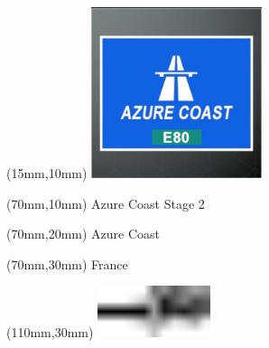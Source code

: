 \null\newpage
\begin{textblock*}{50mm}(15mm,10mm)%
\includegraphics[width=50mm]{LG/2015-05-20_00073.png}
\end{textblock*}
\begin{textblock*}{130mm}(70mm,10mm)%
{\fontsize{20}{20}\selectfont Azure Coast Stage 2}\\
\end{textblock*}
\begin{textblock*}{120mm}(70mm,20mm)%
{\fontsize{16}{16}\selectfont Azure Coast}\\
\end{textblock*}
\begin{textblock*}{120mm}(70mm,30mm)%
{\fontsize{12}{12}\selectfont France}
\end{textblock*}
\begin{textblock*}{30mm}(110mm,30mm)%
\centering
\includegraphics[height=15mm]{icons/tofinish.pdf}
\end{textblock*}
